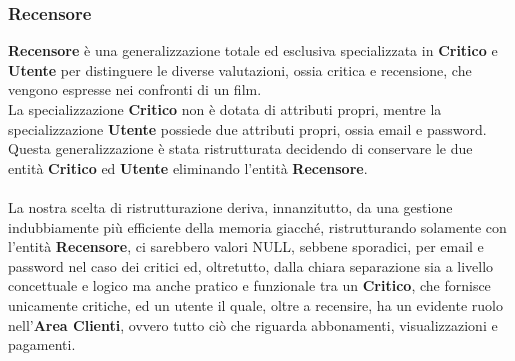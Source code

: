 \documentclass{article}
\begin{document}
\subsubsection{Recensore}
\textbf{Recensore} è una generalizzazione totale ed esclusiva specializzata in \textbf{Critico} e \textbf{Utente} per distinguere le diverse valutazioni, ossia critica e recensione, che vengono espresse nei confronti di un film. 
\\
La specializzazione \textbf{Critico} non è dotata di attributi propri, mentre la specializzazione \textbf{Utente} possiede due attributi propri, ossia email e password. 
\\
Questa generalizzazione è stata ristrutturata decidendo di conservare le due entità \textbf{Critico} ed \textbf{Utente} eliminando l'entità \textbf{Recensore}. 
\\
\\
La nostra scelta di ristrutturazione deriva, innanzitutto, da una gestione indubbiamente più efficiente della memoria giacché, ristrutturando solamente con l'entità \textbf{Recensore}, ci sarebbero valori NULL, sebbene sporadici, per email e password nel caso dei critici ed, oltretutto, dalla chiara separazione sia a livello concettuale e logico ma anche pratico e funzionale tra un \textbf{Critico}, che fornisce unicamente critiche, ed un utente il quale, oltre a recensire, ha un evidente ruolo nell'\textbf{Area Clienti}, ovvero tutto ciò che riguarda abbonamenti, visualizzazioni e pagamenti.
\\
\end{document}
